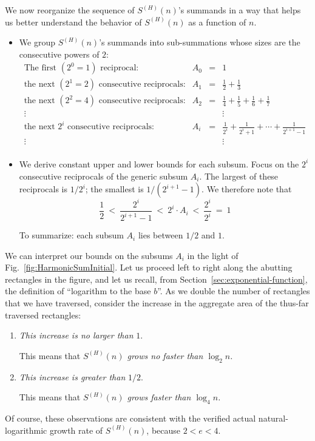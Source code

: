 \medskip

We now reorganize the sequence of $S^{(H)}(n)$'s summands in a way that helps us better understand the behavior of $S^{(H)}(n)$ as a function of $n$.
\begin{itemize}
\item
We group $S^{(H)}(n)$'s summands into sub-summations whose sizes are the consecutive powers of $2$:
\[ \begin{array}{llcl}
\mbox{The first $(2^0 =1)$ reciprocal:} &
A_0 & = &  {\displaystyle 1 } \\[1.01em]
\mbox{the next $(2^1 =2)$ consecutive reciprocals:} &
A_1 & = &  {\displaystyle \frac{1}{2} + \frac{1}{3} }  \\[1.01em]
\mbox{the next $(2^2 =4)$ consecutive reciprocals:} &
A_2 & = &  {\displaystyle \frac{1}{4} + \frac{1}{5} + \frac{1}{6} + \frac{1}{7} } \\
\vdots &  & & \vdots \\
\mbox{the next $2^i$ consecutive reciprocals:} &
A_i & = &  {\displaystyle \frac{1}{2^i} + \frac{1}{2^i+1} + \cdots +
     \frac{1}{2^{i+1}-1}  } \\
\vdots &  & & \vdots \\
\end{array}
\]
\medskip\item
We derive constant upper and lower bounds for each subsum.  Focus on the $2^i$ consecutive reciprocals of the generic subsum $A_i$.  
The largest of these reciprocals is $1/2^i$; the smallest is $1/(2^{i+1}-1)$.  We therefore note that
\[
\frac{1}{2}
 \ < \
\frac{2^i}{2^{i+1}-1}
 \ < \
2^i \cdot A_i
  \ < \
\frac{2^i}{2^i}
  \ = \ 1
\]

To summarize: each subsum $A_i$ lies between $1/2$ and $1$.
\end{itemize}

We can interpret our bounds on the subsums $A_i$ in the light of Fig.~\ref{fig:HarmonicSumInitial}.   Let us proceed left to right along the abutting rectangles in the figure, and let us recall, from Section~\ref{sec:exponential-function}, the definition of
``logarithm to the base $b$''.  As we double the number of rectangles that we have traversed, consider the increase in the aggregate area of the thus-far traversed rectangles:
\begin{enumerate}
\item
{\em This increase is no larger than} $1$.

\smallskip

This means that {\em $S^{(H)}(n)$ grows no faster than $\log_2 n$.}

\medskip\item
{\em This increase is greater than} $1/2$.

\smallskip

This means that {\em $S^{(H)}(n)$ grows faster than $\log_4 n$.}
\end{enumerate}
Of course, these observations are consistent with the verified actual natural-logarithmic growth rate of $S^{(H)}(n)$, because $2 < e < 4$.

